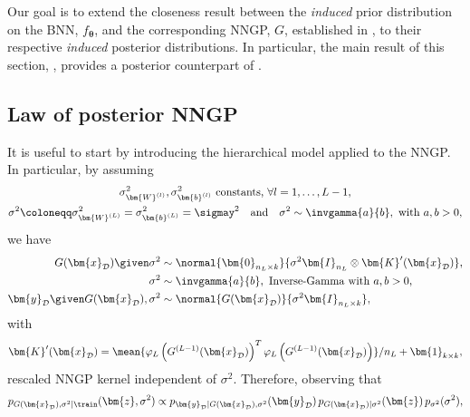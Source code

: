 Our goal is to extend the closeness result between the \textit{induced} prior distribution on the BNN, $f_{\bm{\theta}}$, and the corresponding NNGP, $G$, established in , to their respective \textit{induced} posterior distributions. In particular, the main result of this section, , provides a posterior counterpart of .

\subsection{Law of posterior NNGP} \label{subsec:nngplaw}

It is useful to start by introducing the hierarchical model applied to the NNGP. In particular, by assuming
\begin{equation} \label{eq:hiervariancenngp}
    \begin{gathered}	
        \sigma_{\bm{W}^{(l)}}^2, \sigma_{\bm{b}^{(l)}}^2 \text{ constants, } \forall l = 1, \dots, L - 1, \\
        \sigma^2 \coloneqq \sigma_{\bm{W}^{(L)}}^2 = \sigma_{\bm{b}^{(L)}}^2 = \sigmay^2 \quad \text{and} \quad \sigma^2 \sim \invgamma{a}{b}, \text{ with } a, b > 0,
    \end{gathered}
\end{equation}
we have
\begin{equation} \label{eq:hiermodel}
    \begin{aligned}
        G(\bm{x}_{\mathcal{D}}) \given \sigma^2 & \sim \normal{\bm{0}_{n_L \times k}}{\sigma^2 \bm{I}_{n_L} \otimes \bm{K}'(\bm{x}_{\mathcal{D}})}, \\
        \sigma^2 & \sim \invgamma{a}{b}, \text{ Inverse-Gamma with } a, b > 0, \\
        \bm{y}_{\mathcal{D}} \given G(\bm{x}_{\mathcal{D}}), \sigma^2 & \sim \normal{G(\bm{x}_{\mathcal{D}})}{\sigma^2 \bm{I}_{n_L \times k}},
    \end{aligned}
\end{equation}
with
\begin{align} \label{eq:rescaledkernel}
    \bm{K}'(\bm{x}_{\mathcal{D}}) = \mean{\varphi_{L}\left(G^{(L - 1)}(\bm{x}_{\mathcal{D}})\right)^T \varphi_{L}\left(G^{(L - 1)}(\bm{x}_{\mathcal{D}})\right)} / n_L + \bm{1}_{k \times k},
\end{align}
rescaled NNGP kernel independent of $\sigma^2$. Therefore, observing that
\begin{equation*}
    p_{G(\bm{x}_{\mathcal{D}}), \sigma^2 | \train}(\bm{z}, \sigma^2) \propto p_{\bm{y}_{\mathcal{D}} | G(\bm{x}_{\mathcal{D}}), \sigma^2}(\bm{y}_{\mathcal{D}}) \, p_{G(\bm{x}_{\mathcal{D}}) | \sigma^2}(\bm{z}) \, p_{\sigma^2}(\sigma^2),
\end{equation*}
